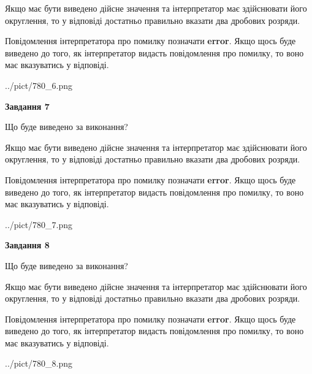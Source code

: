 \documentclass[12pt, ukrainian]{article}
\begin{document}
{\begin {Large}
Якщо має бути виведено дійсне значення та інтерпретатор має здійснювати його округлення, 
то у відповіді достатньо правильно вказати два дробових розряди.

Повідомлення інтерпретатора про помилку позначати \textbf{error}.
Якщо щось буде виведено до того, як інтерпретатор видасть повідомлення про помилку, 
то воно має вказуватись у відповіді. \par

\begin{center}
	{../pict/780_6.png}
\end{center}
\newpage

{\begin {center}\textbf{Завдання 7}\end {center}}\par
Що буде виведено за виконання? \par

Якщо має бути виведено дійсне значення та інтерпретатор має здійснювати його округлення, 
то у відповіді достатньо правильно вказати два дробових розряди.

Повідомлення інтерпретатора про помилку позначати \textbf{error}.
Якщо щось буде виведено до того, як інтерпретатор видасть повідомлення про помилку, 
то воно має вказуватись у відповіді. \par

\begin{center}
	{../pict/780_7.png}
\end{center}
\newpage

{\begin {center}\textbf{Завдання 8}\end {center}}\par
Що буде виведено за виконання? \par

Якщо має бути виведено дійсне значення та інтерпретатор має здійснювати його округлення, 
то у відповіді достатньо правильно вказати два дробових розряди.

Повідомлення інтерпретатора про помилку позначати \textbf{error}.
Якщо щось буде виведено до того, як інтерпретатор видасть повідомлення про помилку, 
то воно має вказуватись у відповіді. \par

\begin{center}
	{../pict/780_8.png}
\end{center}
\newpage


\end{Large}}
\end{document}
